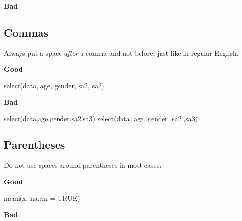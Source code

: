 \documentclass[
]{book}
\newenvironment{Shaded}{\begin{snugshade}}{\end{snugshade}}
\newcommand{\AttributeTok}[1]{\textcolor[rgb]{0.77,0.63,0.00}{#1}}
\newcommand{\ConstantTok}[1]{\textcolor[rgb]{0.00,0.00,0.00}{#1}}
\newcommand{\DecValTok}[1]{\textcolor[rgb]{0.00,0.00,0.81}{#1}}
\newcommand{\FunctionTok}[1]{\textcolor[rgb]{0.00,0.00,0.00}{#1}}
\newcommand{\NormalTok}[1]{#1}
\newcommand{\SpecialCharTok}[1]{\textcolor[rgb]{0.00,0.00,0.00}{#1}}
\begin{document}
\textbf{Bad}

\begin{Shaded}
\end{Shaded}

\hypertarget{commas}{%
\subsection{Commas}\label{commas}}

Always put a space \emph{after} a comma and not before, just like in regular English.

\textbf{Good}

\begin{Shaded}
\begin{Highlighting}[]
\FunctionTok{select}\NormalTok{(data, age, gender, sa2, sa3)}
\end{Highlighting}
\end{Shaded}

\textbf{Bad}

\begin{Shaded}
\begin{Highlighting}[]
\FunctionTok{select}\NormalTok{(data,age,gender,sa2,sa3)}
\FunctionTok{select}\NormalTok{(data ,age ,gender ,sa2 ,sa3)}
\end{Highlighting}
\end{Shaded}

\hypertarget{parentheses}{%
\subsection{Parentheses}\label{parentheses}}

Do not use spaces around parentheses in most cases:

\textbf{Good}

\begin{Shaded}
\begin{Highlighting}[]
\FunctionTok{mean}\NormalTok{(x, }\AttributeTok{na.rm =} \ConstantTok{TRUE}\NormalTok{)}
\end{Highlighting}
\end{Shaded}

\textbf{Bad}
\end{document}
